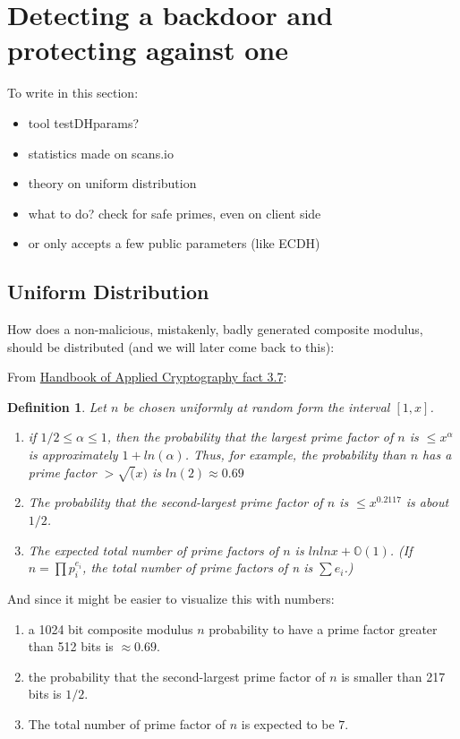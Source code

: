 \documentclass[a4paper,11pt,twocolumn]{article}
\newtheorem{definition}{Definition}
\begin{document}
\section{Detecting a backdoor and protecting against one}

To write in this section:

\begin{itemize}
    \item tool testDHparams?
    \item statistics made on scans.io
    \item theory on uniform distribution
    \item what to do? check for safe primes, even on client side
    \item or only accepts a few public parameters (like ECDH)
\end{itemize}

\subsection{Uniform Distribution}

How does a non-malicious, mistakenly, badly generated composite modulus, should be distributed (and we will later come back to this):

From \href{http://cacr.uwaterloo.ca/hac/about/chap3.pdf}{Handbook of Applied Cryptography fact 3.7}:

\begin{definition}
    Let $n$ be chosen uniformly at random form the interval $[1, x]$.
    \begin{enumerate}
        \item if $1/2 \leq \alpha \leq 1$, then the probability that the largest prime factor of $n$ is $\leq x^{\alpha}$ is approximately $1+ ln(\alpha)$. Thus, for example, the probability than $n$ has a prime factor $> \sqrt(x)$ is $ln(2) \approx 0.69$
        \item The probability that the second-largest prime factor of $n$ is $\leq x^{0.2117}$ is about $1/2$. 
        \item The expected total number of prime factors of $n$ is $ln ln x + \mathbb{O}(1)$. (If $n = \prod p_i^{e_i}$, the total number of prime factors of n is $\sum e_i$.)
    \end{enumerate} 
\end{definition}

And since it might be easier to visualize this with numbers:

\begin{enumerate}
    \item a 1024 bit composite modulus $n$ probability to have a prime factor greater than 512 bits is $\approx 0.69$.
    \item the probability that the second-largest prime factor of $n$ is smaller than 217 bits is $1/2$.
    \item The total number of prime factor of $n$ is expected to be $7$.
\end{enumerate}
\end{document}
